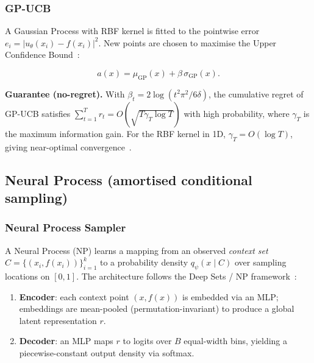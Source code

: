 \documentclass[11pt,a4paper]{article}
\begin{document}
\subsubsection{GP-UCB}
\label{sec:gpucb}

A Gaussian Process with RBF kernel is fitted to the pointwise error
$e_i = |u_\theta(x_i)-f(x_i)|^2$.  New points are chosen to maximise the
Upper Confidence Bound~\citep{srinivas2010gaussian}:

\begin{equation}
  a(x) = \mu_{\text{GP}}(x) + \beta\,\sigma_{\text{GP}}(x).
\end{equation}

\textbf{Guarantee (no-regret).}
With $\beta_t = 2\log(t^2\pi^2/6\delta)$, the cumulative regret of
GP-UCB satisfies $\sum_{t=1}^T r_t = O(\sqrt{T\gamma_T\log T})$ with
high probability, where $\gamma_T$ is the maximum information gain.
For the RBF kernel in 1D, $\gamma_T = O(\log T)$, giving near-optimal
convergence~\citep{srinivas2010gaussian}.

\subsection{Neural Process (amortised conditional sampling)}
\label{sec:neural_process}

\subsubsection{Neural Process Sampler}
\label{sec:np-detail}

A Neural Process (NP) learns a mapping from an observed \emph{context
set} $C = \{(x_i, f(x_i))\}_{i=1}^k$ to a probability density
$q_\psi(x \mid C)$ over sampling locations on $[0,1]$.  The
architecture follows the Deep Sets / NP framework~\citep{garnelo2018conditional,garnelo2018neural}:

\begin{enumerate}
  \item \textbf{Encoder}: each context point $(x, f(x))$ is embedded
        via an MLP; embeddings are mean-pooled (permutation-invariant)
        to produce a global latent representation $r$.
  \item \textbf{Decoder}: an MLP maps $r$ to logits over $B$ equal-width
        bins, yielding a piecewise-constant output density via softmax.
\end{enumerate}
\end{document}
